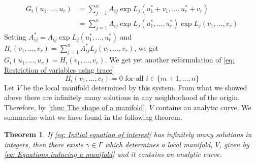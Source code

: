 \documentclass{article}
\newtheorem{theorem}{Theorem}[section]
\begin{document}
\begin{align*}
    G_i(u_1, ..., u_r) &= \sum_{j = 1}^n A_{ij} \exp L_j(u_1^* + v_1, ..., u_r^* + v_r) \\ 
    &= \sum_{j = 1}^n A_{ij} \exp L_j(u_1^*, ..., u_r^*) \exp L_j(v_1, ..., v_r)
\end{align*}
Setting $A_{ij}^* = A_{ij} \exp L_j(u_1^*, ..., u_r^*)$ and $H_i(v_1, ..., v_r) = \sum_{j = 1}^n A_{ij}^* L_j(v_1, ..., v_r)$, we get
$G_i(u_1, ..., u_r) = H_i(v_1, ..., v_r)$. We get yet another reformulation of \cref{eq: Restriction of variables using trace}
\begin{equation}\label{eq: Equations inducing a manifold}
    H_i(v_1, ..., v_t) = 0 \text{ for all } i \in \{m+1, ..., n\}   
\end{equation}
Let $V$ be the local manifold determined by this system. From what we showed above there are infinitely many solutions in any neighborhood of the origin. Therefore, by \cref{thm: The shape of a manifold}, $V$ contains an analytic curve. We summarize what we have found in the following theorem.

\begin{theorem}\label{thm: Skolems method}
    If \cref{eq: Initial equation of interest} has infinitely many solutions in integers, then there exists $\gamma \in \Gamma$ which determines a local manifold, $V$, given by \cref{eq: Equations inducing a manifold} and it contains an analytic curve. 
\end{theorem}
\end{document}

